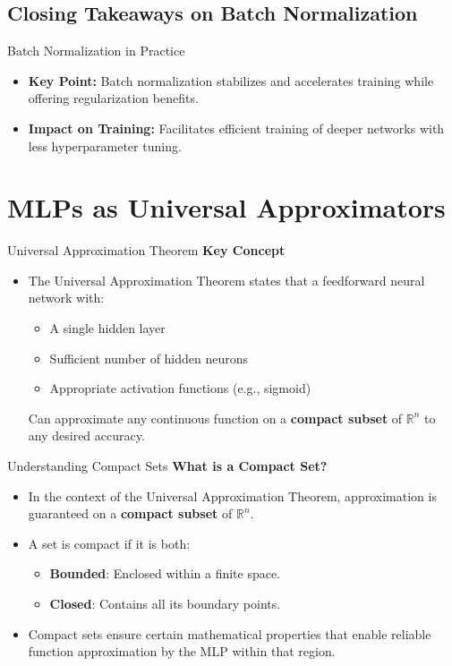 \documentclass[serif, aspectratio=169]{beamer}
\begin{document}
\subsection{Closing Takeaways on Batch Normalization}

\begin{frame}{Batch Normalization in Practice}
    
    \begin{itemize}

    \item \textbf{Key Point:} Batch normalization stabilizes and accelerates training while offering regularization benefits.
    \item \textbf{Impact on Training:} Facilitates efficient training of deeper networks with less hyperparameter tuning.

\end{itemize}

\end{frame}

\section{MLPs as Universal Approximators}

\begin{frame}{Universal Approximation Theorem}
	\textbf{Key Concept}
	\begin{itemize}
		\item The Universal Approximation Theorem states that a feedforward neural network with:
		\begin{itemize}
			\item A single hidden layer
			\item Sufficient number of hidden neurons
			\item Appropriate activation functions (e.g., sigmoid)
		\end{itemize}
		Can approximate any continuous function on a \textbf{compact subset} of $\mathbb{R}^n$ to any desired accuracy.
	\end{itemize}
	
\end{frame}

\begin{frame}{Understanding Compact Sets}
	\textbf{What is a Compact Set?}
	\begin{itemize}
		\item In the context of the Universal Approximation Theorem, approximation is guaranteed on a \textbf{compact subset} of $\mathbb{R}^n$.
		\item A set is compact if it is both:
		\begin{itemize}
			\item \textbf{Bounded}: Enclosed within a finite space.
			\item \textbf{Closed}: Contains all its boundary points.
		\end{itemize}
		\item Compact sets ensure certain mathematical properties that enable reliable function approximation by the MLP within that region.
	\end{itemize}
\end{frame}
\end{document}
